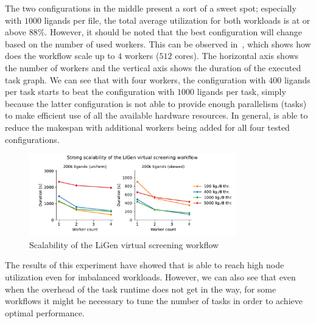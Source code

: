 The two configurations in the middle present a sort of a sweet spot; especially with
$1000$ ligands per file, the total average utilization for both workloads is at or
above $88\%$. However, it should be noted that the best configuration will change
based on the number of used workers. This can be observed in~, which shows
how does the workflow scale up to $4$ workers ($512$ cores).
The horizontal axis shows the number of workers and the vertical axis shows the duration of the
executed task graph. We can see that with four workers, the configuration with
$400$ ligands per task starts to beat the configuration with
$1000$ ligands per task, simply because the latter configuration is not able to
provide enough parallelism (tasks) to make efficient use of all the available hardware resources.
In general, \hyperqueue{} is able to reduce the makespan with additional workers being
added for all four tested configurations.

\begin{figure}[h]
	\centering
	\includegraphics[width=0.8\textwidth]{imgs/hq/charts/ligen-aggregation-scalability}
	\caption{Scalability of the LiGen virtual screening workflow}
	\label{fig:hq-ligen-scalability}
\end{figure}

The results of this experiment have showed that \hyperqueue{} is able to reach high node
utilization even for imbalanced workloads. However, we can also see that even when the overhead of
the task runtime does not get in the way, for some workflows it might be necessary to tune the
number of tasks in order to achieve optimal performance.

